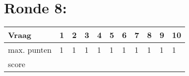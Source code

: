 




\begin{center}
\end{center}
\vspace{5mm}
 
 
\vspace{5mm}
 
\section{Ronde 8:}
\begin{questions}

\end{questions}
\begin{table}[!b]
\centering
\begin{tabular}{|l|l|l|l|l|l|l|l|l|l|l|}
\hline
Vraag       & 1 & 2 & 3 & 4 & 5 & 6 & 7 & 8 & 9 & 10 \\ \hline
max. punten & 1 & 1 & 1 & 1 & 1 & 1 & 1 & 1 & 1 & 1  \\ \hline
score       &   &   &   &   &   &   &   &   &   &    \\ \hline
\end{tabular}
\end{table}
\newpage
